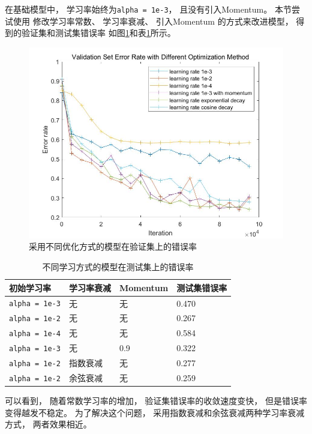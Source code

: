 \documentclass{article}
\begin{document}
在基础模型中，
学习率始终为\verb|alpha = 1e-3|，
且没有引入Momentum。
本节尝试使用
修改学习率常数、
学习率衰减、
引入Momentum
的方式来改进模型，
得到的验证集和测试集错误率
如图\ref{fig:2}和表\ref{table:2}所示。

\begin{figure}[h]
\includegraphics[width=\textwidth]{2.jpg}
\caption{采用不同优化方式的模型在验证集上的错误率}
\label{fig:2}
\end{figure}

\begin{table}[h]
\centering
\begin{tabular}{|l|l|l|l|} 
\hline
初始学习率 & 学习率衰减 & Momentum & 测试集错误率 \\
\hline
\verb|alpha = 1e-3| & 无 & 无 & 0.470 \\
\verb|alpha = 1e-2| & 无 & 无 & 0.267\\
\verb|alpha = 1e-4| & 无 & 无 & 0.584\\
\verb|alpha = 1e-3| & 无 & 0.9 & 0.322\\
\verb|alpha = 1e-2| & 指数衰减 & 无 & 0.277 \\
\verb|alpha = 1e-2| & 余弦衰减 & 无 & 0.259 \\
\hline
\end{tabular}
\caption{不同学习方式的模型在测试集上的错误率}
\label{table:2}
\end{table}

可以看到，
随着常数学习率的增加，
验证集错误率的收敛速度变快，
但是错误率变得越发不稳定。
为了解决这个问题，
采用指数衰减和余弦衰减两种学习率衰减方式，
两者效果相近。
\end{document}
